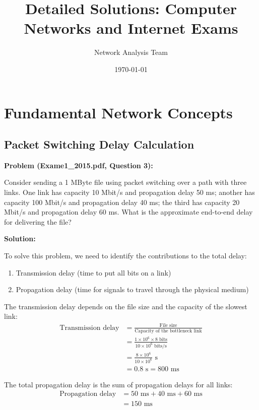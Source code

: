 \documentclass[11pt,a4paper]{article}
\title{Detailed Solutions: Computer Networks and Internet Exams}
\author{Network Analysis Team}
\date{\today}
\begin{document}
\maketitle
\tableofcontents
\newpage

\section{Fundamental Network Concepts}

\subsection{Packet Switching Delay Calculation}
\textbf{Problem (Exame1\_2015.pdf, Question 3):}

Consider sending a 1 MByte file using packet switching over a path with three links. One link has capacity 10 Mbit/s and propagation delay 50 ms; another has capacity 100 Mbit/s and propagation delay 40 ms; the third has capacity 20 Mbit/s and propagation delay 60 ms. What is the approximate end-to-end delay for delivering the file?

\textbf{Solution:}

To solve this problem, we need to identify the contributions to the total delay:

\begin{enumerate}
    \item Transmission delay (time to put all bits on a link)
    \item Propagation delay (time for signals to travel through the physical medium)
\end{enumerate}

The transmission delay depends on the file size and the capacity of the slowest link:
\begin{align}
    \text{Transmission delay} &= \frac{\text{File size}}{\text{Capacity of the bottleneck link}}\\
    &= \frac{1 \times 10^6 \times 8 \text{ bits}}{10 \times 10^6 \text{ bits/s}}\\
    &= \frac{8 \times 10^6}{10 \times 10^6} \text{ s}\\
    &= 0.8 \text{ s} = 800 \text{ ms}
\end{align}

The total propagation delay is the sum of propagation delays for all links:
\begin{align}
    \text{Propagation delay} &= 50 \text{ ms} + 40 \text{ ms} + 60 \text{ ms}\\
    &= 150 \text{ ms}
\end{align}
\end{document}
